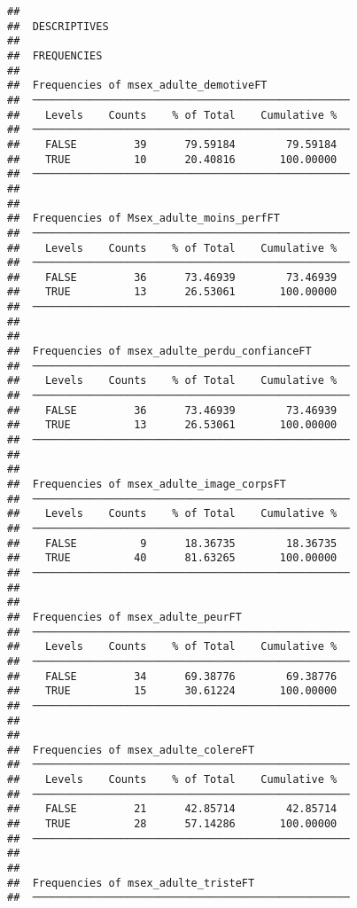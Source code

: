 \documentclass[
]{article}
\begin{document}
\begin{verbatim}
## 
##  DESCRIPTIVES
## 
##  FREQUENCIES
## 
##  Frequencies of msex_adulte_demotiveFT              
##  ────────────────────────────────────────────────── 
##    Levels    Counts    % of Total    Cumulative %   
##  ────────────────────────────────────────────────── 
##    FALSE         39      79.59184        79.59184   
##    TRUE          10      20.40816       100.00000   
##  ────────────────────────────────────────────────── 
## 
## 
##  Frequencies of Msex_adulte_moins_perfFT            
##  ────────────────────────────────────────────────── 
##    Levels    Counts    % of Total    Cumulative %   
##  ────────────────────────────────────────────────── 
##    FALSE         36      73.46939        73.46939   
##    TRUE          13      26.53061       100.00000   
##  ────────────────────────────────────────────────── 
## 
## 
##  Frequencies of msex_adulte_perdu_confianceFT       
##  ────────────────────────────────────────────────── 
##    Levels    Counts    % of Total    Cumulative %   
##  ────────────────────────────────────────────────── 
##    FALSE         36      73.46939        73.46939   
##    TRUE          13      26.53061       100.00000   
##  ────────────────────────────────────────────────── 
## 
## 
##  Frequencies of msex_adulte_image_corpsFT           
##  ────────────────────────────────────────────────── 
##    Levels    Counts    % of Total    Cumulative %   
##  ────────────────────────────────────────────────── 
##    FALSE          9      18.36735        18.36735   
##    TRUE          40      81.63265       100.00000   
##  ────────────────────────────────────────────────── 
## 
## 
##  Frequencies of msex_adulte_peurFT                  
##  ────────────────────────────────────────────────── 
##    Levels    Counts    % of Total    Cumulative %   
##  ────────────────────────────────────────────────── 
##    FALSE         34      69.38776        69.38776   
##    TRUE          15      30.61224       100.00000   
##  ────────────────────────────────────────────────── 
## 
## 
##  Frequencies of msex_adulte_colereFT                
##  ────────────────────────────────────────────────── 
##    Levels    Counts    % of Total    Cumulative %   
##  ────────────────────────────────────────────────── 
##    FALSE         21      42.85714        42.85714   
##    TRUE          28      57.14286       100.00000   
##  ────────────────────────────────────────────────── 
## 
## 
##  Frequencies of msex_adulte_tristeFT                
##  ────────────────────────────────────────────────── 

\end{verbatim}
\end{document}
